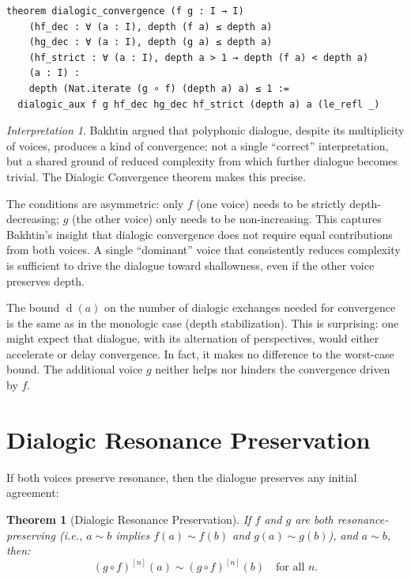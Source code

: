 \documentclass[11pt,openany]{book}
\theoremstyle{definition}
\theoremstyle{plain}
\newtheorem{theorem}[axiom]{Theorem}
\theoremstyle{remark}
\newtheorem{interpretation}[axiom]{Interpretation}
\newcommand{\res}{\sim}                      %
\newcommand{\depth}{\operatorname{d}}       %
\begin{document}
\begin{lstlisting}
theorem dialogic_convergence (f g : I → I)
    (hf_dec : ∀ (a : I), depth (f a) ≤ depth a)
    (hg_dec : ∀ (a : I), depth (g a) ≤ depth a)
    (hf_strict : ∀ (a : I), depth a > 1 → depth (f a) < depth a)
    (a : I) :
    depth (Nat.iterate (g ∘ f) (depth a) a) ≤ 1 :=
  dialogic_aux f g hf_dec hg_dec hf_strict (depth a) a (le_refl _)
\end{lstlisting}

\begin{interpretation}
Bakhtin argued that polyphonic dialogue, despite its multiplicity of voices, produces a kind of convergence: not a single ``correct'' interpretation, but a shared ground of reduced complexity from which further dialogue becomes trivial. The Dialogic Convergence theorem makes this precise.

The conditions are asymmetric: only $f$ (one voice) needs to be strictly depth-decreasing; $g$ (the other voice) only needs to be non-increasing. This captures Bakhtin's insight that dialogic convergence does not require equal contributions from both voices. A single ``dominant'' voice that consistently reduces complexity is sufficient to drive the dialogue toward shallowness, even if the other voice preserves depth.

The bound $\depth(a)$ on the number of dialogic exchanges needed for convergence is the same as in the monologic case (depth stabilization). This is surprising: one might expect that dialogue, with its alternation of perspectives, would either accelerate or delay convergence. In fact, it makes no difference to the worst-case bound. The additional voice $g$ neither helps nor hinders the convergence driven by $f$.
\end{interpretation}

\section{Dialogic Resonance Preservation}

If both voices preserve resonance, then the dialogue preserves any initial agreement:

\begin{theorem}[Dialogic Resonance Preservation]
If $f$ and $g$ are both resonance-preserving (i.e., $a \res b$ implies $f(a) \res f(b)$ and $g(a) \res g(b)$), and $a \res b$, then:
\[
(g \circ f)^{[n]}(a) \res (g \circ f)^{[n]}(b) \quad \text{for all } n.
\]
\end{theorem}
\end{document}
